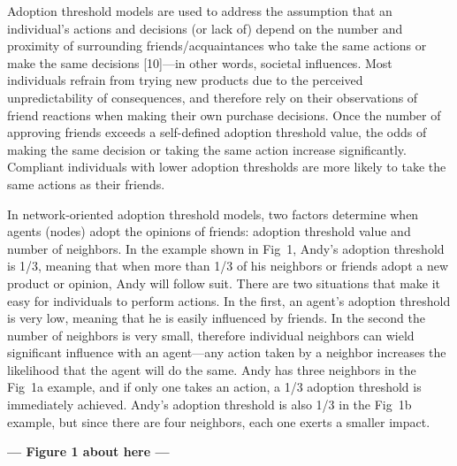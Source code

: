 \documentclass[10pt,letterpaper]{article}
\begin{document}
Adoption threshold models are used to address the assumption that an individual's actions and decisions (or lack of) depend on the number and proximity of surrounding friends/acquaintances who take the same actions or make the same decisions [10]---in other words, societal influences. Most individuals refrain from trying new products due to the perceived unpredictability of consequences, and therefore rely on their observations of friend reactions when making their own purchase decisions. Once the number of approving friends exceeds a self-defined adoption threshold value, the odds of making the same decision or taking the same action increase significantly. Compliant individuals with lower adoption thresholds are more likely to take the same actions as their friends.

In network-oriented adoption threshold models, two factors determine when agents (nodes) adopt the opinions of friends: adoption threshold value and number of neighbors. In the example shown in Fig~1, Andy's adoption threshold is 1/3, meaning that when more than 1/3 of his neighbors or friends adopt a new product or opinion, Andy will follow suit. There are two situations that make it easy for individuals to perform actions. In the first, an agent's adoption threshold is very low, meaning that he is easily influenced by friends. In the second the number of neighbors is very small, therefore individual neighbors can wield significant influence with an agent---any action taken by a neighbor increases the likelihood that the agent will do the same. Andy has three neighbors in the Fig~1a example, and if only one takes an action, a 1/3 adoption threshold is immediately achieved. Andy's adoption threshold is also 1/3 in the Fig~1b example, but since there are four neighbors, each one exerts a smaller impact.



\begin{center}\textbf{--- Figure 1 about here ---}\end{center}
\end{document}
